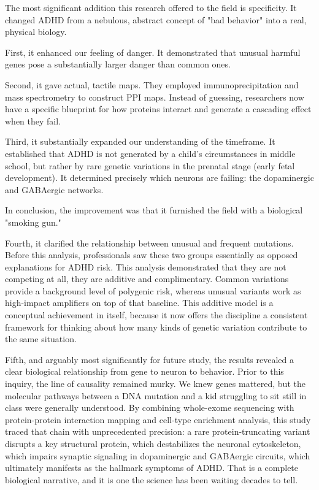 The most significant addition this research offered to the field is specificity.  It changed ADHD from a nebulous, abstract concept of "bad behavior" into a real, physical biology.  

First, it enhanced our feeling of danger.  It demonstrated that unusual harmful genes pose a substantially larger danger than common ones.  

Second, it gave actual, tactile maps.  They employed immunoprecipitation and mass spectrometry to construct PPI maps.  Instead of guessing, researchers now have a specific blueprint for how proteins interact and generate a cascading effect when they fail.  

Third, it substantially expanded our understanding of the timeframe.  It established that ADHD is not generated by a child's circumstances in middle school, but rather by rare genetic variations in the prenatal stage (early fetal development).  It determined precisely which neurons are failing: the dopaminergic and GABAergic networks.  

In conclusion, the improvement was that it furnished the field with a biological "smoking gun."  

Fourth, it clarified the relationship between unusual and frequent mutations.  Before this analysis, professionals saw these two groups essentially as opposed explanations for ADHD risk.  This analysis demonstrated that they are not competing at all, they are additive and complimentary.  Common variations provide a background level of polygenic risk, whereas unusual variants work as high-impact amplifiers on top of that baseline.  This additive model is a conceptual achievement in itself, because it now offers the discipline a consistent framework for thinking about how many kinds of genetic variation contribute to the same situation.  

Fifth, and arguably most significantly for future study, the results revealed a clear biological relationship from gene to neuron to behavior.  Prior to this inquiry, the line of causality remained murky.  We knew genes mattered, but the molecular pathways between a DNA mutation and a kid struggling to sit still in class were generally understood.  By combining whole-exome sequencing with protein-protein interaction mapping and cell-type enrichment analysis, this study traced that chain with unprecedented precision: a rare protein-truncating variant disrupts a key structural protein, which destabilizes the neuronal cytoskeleton, which impairs synaptic signaling in dopaminergic and GABAergic circuits, which ultimately manifests as the hallmark symptoms of ADHD.  That is a complete biological narrative, and it is one the science has been waiting decades to tell.  

